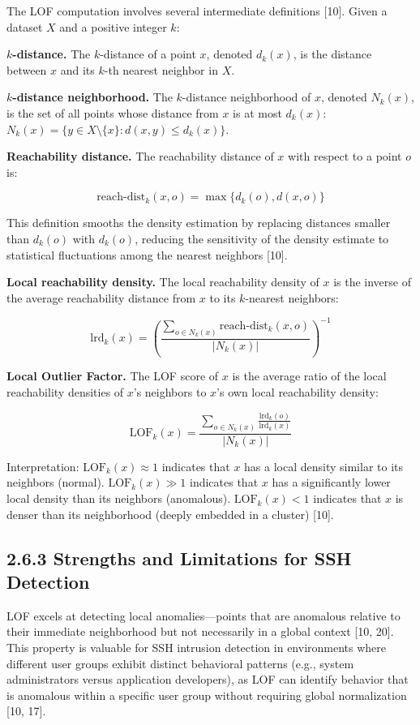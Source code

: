 \documentclass[
  a4paper]{report}
\begin{document}
The LOF computation involves several intermediate definitions {[}10{]}.
Given a dataset \(X\) and a positive integer \(k\):

\textbf{\(k\)-distance.} The \(k\)-distance of a point \(x\), denoted
\(d_k(x)\), is the distance between \(x\) and its \(k\)-th nearest
neighbor in \(X\).

\textbf{\(k\)-distance neighborhood.} The \(k\)-distance neighborhood of
\(x\), denoted \(N_k(x)\), is the set of all points whose distance from
\(x\) is at most \(d_k(x)\):
\(N_k(x) = \{y \in X \setminus \{x\} : d(x, y) \leq d_k(x)\}\).

\textbf{Reachability distance.} The reachability distance of \(x\) with
respect to a point \(o\) is:

\[\text{reach-dist}_k(x, o) = \max\{d_k(o), d(x, o)\}\]

This definition smooths the density estimation by replacing distances
smaller than \(d_k(o)\) with \(d_k(o)\), reducing the sensitivity of the
density estimate to statistical fluctuations among the nearest neighbors
{[}10{]}.

\textbf{Local reachability density.} The local reachability density of
\(x\) is the inverse of the average reachability distance from \(x\) to
its \(k\)-nearest neighbors:

\[\text{lrd}_k(x) = \left( \frac{\sum_{o \in N_k(x)} \text{reach-dist}_k(x, o)}{|N_k(x)|} \right)^{-1}\]

\textbf{Local Outlier Factor.} The LOF score of \(x\) is the average
ratio of the local reachability densities of \(x\)'s neighbors to
\(x\)'s own local reachability density:

\[\text{LOF}_k(x) = \frac{\sum_{o \in N_k(x)} \frac{\text{lrd}_k(o)}{\text{lrd}_k(x)}}{|N_k(x)|}\]

Interpretation: \(\text{LOF}_k(x) \approx 1\) indicates that \(x\) has a
local density similar to its neighbors (normal).
\(\text{LOF}_k(x) \gg 1\) indicates that \(x\) has a significantly lower
local density than its neighbors (anomalous). \(\text{LOF}_k(x) < 1\)
indicates that \(x\) is denser than its neighborhood (deeply embedded in
a cluster) {[}10{]}.

\subsection{2.6.3 Strengths and Limitations for SSH
Detection}\label{strengths-and-limitations-for-ssh-detection}

LOF excels at detecting local anomalies---points that are anomalous
relative to their immediate neighborhood but not necessarily in a global
context {[}10, 20{]}. This property is valuable for SSH intrusion
detection in environments where different user groups exhibit distinct
behavioral patterns (e.g., system administrators versus application
developers), as LOF can identify behavior that is anomalous within a
specific user group without requiring global normalization {[}10, 17{]}.
\end{document}
